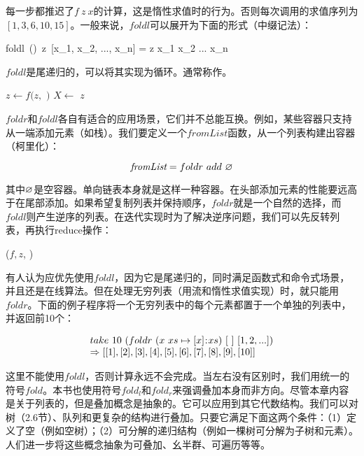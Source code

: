 \documentclass[b5paper]{ctexart}
\begin{document}
每一步都推迟了$f\ z\ x$的计算，这是惰性求值时的行为。否则每次调用的求值序列为$[1, 3, 6, 10, 15]$。一般来说，$foldl$可以展开为下面的形式（中缀记法）：


\be
foldl\ (\oplus)\ z\ [x_1, x_2, ..., x_n] = z \oplus x_1 \oplus x_2 \oplus ... \oplus x_n
\ee

$foldl$是尾递归的，可以将其实现为循环。通常称作。

\begin{algorithmic}[1]
    \State $z \gets f(z, $  $)$
    \State $X \gets$ 
  \EndWhile
  \State \Return $z$
\EndFunction
\end{algorithmic}

$foldr$和$foldl$各自有适合的应用场景，它们并不总能互换。例如，某些容器只支持从一端添加元素（如栈）。我们要定义一个$\textit{fromList}$函数，从一个列表构建出容器（柯里化）：

\[
\textit{fromList} = foldr\ add\ \nil
\]

其中$\varnothing$是空容器。单向链表本身就是这样一种容器。在头部添加元素的性能要远高于在尾部添加。如果希望复制列表并保持顺序，$foldr$就是一个自然的选择，而$foldl$则产生逆序的列表。在迭代实现时为了解决逆序问题，我们可以先反转列表，再执行reduce操作：

\begin{algorithmic}[1]
  \State \Return {}($f, z$, )
\EndFunction
\end{algorithmic}

有人认为应优先使用$foldl$，因为它是尾递归的，同时满足函数式和命令式场景，并且还是在线算法。但在处理无穷列表（用流和惰性求值实现）时，就只能用$foldr$。下面的例子程序将一个无穷列表中的每个元素都置于一个单独的列表中，并返回前10个：

\[
\begin{array}{l}
take\ 10\ (foldr\ (x\ xs \mapsto [x] \mathbin{\!:\!} xs)\ [\ ]\ [1, 2, ...]) \\
\Rightarrow [[1], [2], [3], [4], [5], [6], [7], [8], [9], [10]]
\end{array}
\]

这里不能使用$foldl$，否则计算永远不会完成。当左右没有区别时，我们用统一的符号$fold$。本书也使用符号$fold_l$和$fold_r$来强调叠加本身而非方向。尽管本章内容是关于列表的，但是叠加概念是抽象的。它可以应用到其它代数结构。我们可以对树（\cite{unplugged}2.6节）、队列和更复杂的结构进行叠加。只要它满足下面这两个条件：（1）定义了空（例如空树）；（2）可分解的递归结构（例如一棵树可分解为子树和元素）。人们进一步将这些概念抽象为可叠加、幺半群、可遍历等等。
\end{document}
